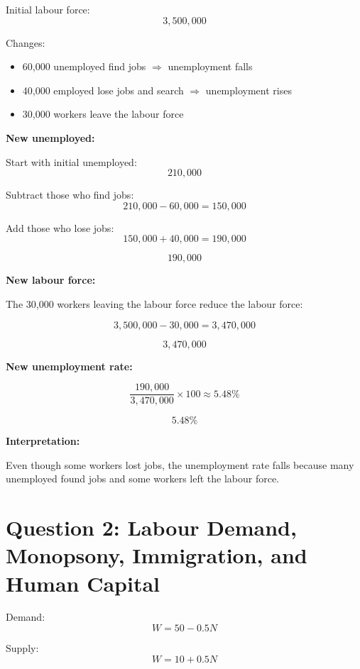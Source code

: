 \documentclass[12pt]{article}
\begin{document}
\begin{enumerate}[label=(\alph*)]
Initial labour force:
\[
3{,}500{,}000
\]

Changes:
\begin{itemize}
    \item 60,000 unemployed find jobs \(\Rightarrow\) unemployment falls
    \item 40,000 employed lose jobs and search \(\Rightarrow\) unemployment rises
    \item 30,000 workers leave the labour force
\end{itemize}

\textbf{New unemployed:}

Start with initial unemployed:
\[
210{,}000
\]

Subtract those who find jobs:
\[
210{,}000-60{,}000=150{,}000
\]

Add those who lose jobs:
\[
150{,}000+40{,}000=190{,}000
\]

\[
\boxed{190{,}000}
\]

\textbf{New labour force:}

The 30,000 workers leaving the labour force reduce the labour force:

\[
3{,}500{,}000-30{,}000=3{,}470{,}000
\]

\[
\boxed{3{,}470{,}000}
\]

\textbf{New unemployment rate:}

\[
\frac{190{,}000}{3{,}470{,}000}\times 100 \approx 5.48\%
\]

\[
\boxed{5.48\%}
\]

\textbf{Interpretation:}

Even though some workers lost jobs, the unemployment rate falls because many unemployed found jobs and some workers left the labour force.

\end{enumerate}

\section*{Question 2: Labour Demand, Monopsony, Immigration, and Human Capital}

Demand:
\[
W=50-0.5N
\]

Supply:
\[
W=10+0.5N
\]
\end{document}
